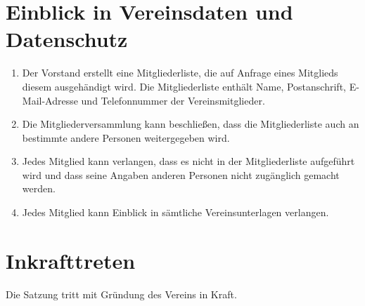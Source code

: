 \documentclass[ngerman]{article}
\begin{document}
\section{Einblick in Vereinsdaten und Datenschutz}
\begin{enumerate}
  \item Der Vorstand erstellt eine Mitgliederliste, die auf Anfrage eines Mitglieds diesem ausgehändigt wird. Die Mitgliederliste enthält Name, Postanschrift, E-Mail-Adresse und Telefonnummer der Vereinsmitglieder.
  \item Die Mitgliederversammlung kann beschließen, dass die Mitgliederliste auch an bestimmte andere Personen weitergegeben wird.
  \item Jedes Mitglied kann verlangen, dass es nicht in der Mitgliederliste aufgeführt wird und dass seine Angaben anderen Personen nicht zugänglich gemacht werden.
  \item Jedes Mitglied kann Einblick in sämtliche Vereinsunterlagen verlangen.
\end{enumerate}


\section{Inkrafttreten}
Die Satzung tritt mit Gründung des Vereins in Kraft.
\end{document}
